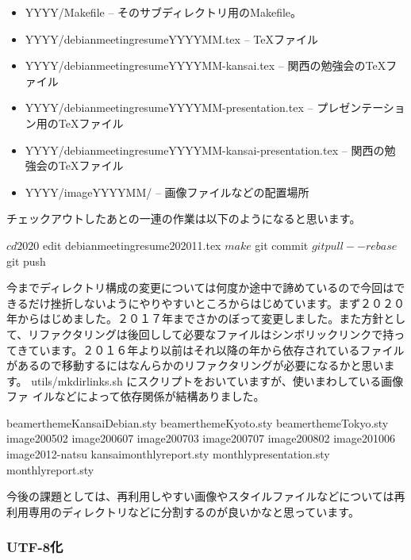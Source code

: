 \documentclass[mingoth,a4paper]{jsarticle}
\begin{document}
\begin{itemize}
 \item YYYY/Makefile -- そのサブディレクトリ用のMakefile。
 \item YYYY/debianmeetingresumeYYYYMM.tex -- TeXファイル
 \item YYYY/debianmeetingresumeYYYYMM-kansai.tex -- 関西の勉強会のTeXファイル
 \item YYYY/debianmeetingresumeYYYYMM-presentation.tex -- プレゼンテーション用のTeXファイル
 \item YYYY/debianmeetingresumeYYYYMM-kansai-presentation.tex -- 関西の勉強会のTeXファイル
 \item YYYY/imageYYYYMM/ -- 画像ファイルなどの配置場所
\end{itemize}

チェックアウトしたあとの一連の作業は以下のようになると思います。

\begin{commandline}
$ cd 2020
$ edit debianmeetingresume202011.tex
$ make
$ git commit 
$ git pull --rebase
$ git push
 \end{commandline}

今までディレクトリ構成の変更については何度か途中で諦めているので今回はで
きるだけ挫折しないようにやりやすいところからはじめています。まず２０２０
年からはじめました。２０１７年までさかのぼって変更しました。また方針とし
て、リファクタリングは後回しして必要なファイルはシンボリックリンクで持っ
てきています。２０１６年より以前はそれ以降の年から依存されているファイル
があるので移動するにはなんらかのリファクタリングが必要になるかと思います。
utils/mkdirlinks.sh にスクリプトをおいていますが、使いまわしている画像ファ
イルなどによって依存関係が結構ありました。

\begin{commandline}
    beamerthemeKansaiDebian.sty
    beamerthemeKyoto.sty
    beamerthemeTokyo.sty
    image200502
    image200607
    image200703
    image200707
    image200802
    image201006
    image2012-natsu
    kansaimonthlyreport.sty
    monthlypresentation.sty
    monthlyreport.sty
\end{commandline}

今後の課題としては、再利用しやすい画像やスタイルファイルなどについては再
利用専用のディレクトリなどに分割するのが良いかなと思っています。

\subsubsection{UTF-8化}
\end{document}
